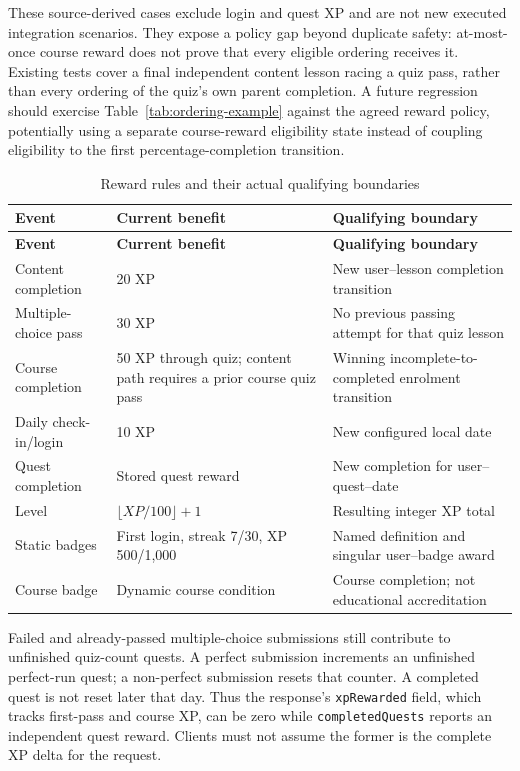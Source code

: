 \documentclass[12pt,a4paper,oneside]{report}
\begin{document}
These source-derived cases exclude login and quest XP and are not new executed
integration scenarios. They expose a policy gap beyond duplicate safety: at-most-once
course reward does not prove that every eligible ordering receives it. Existing tests
cover a final independent content lesson racing a quiz pass, rather than every
ordering of the quiz's own parent completion. A future regression should exercise
Table~\ref{tab:ordering-example} against the agreed reward policy, potentially using
a separate course-reward eligibility state instead of coupling eligibility to the
first percentage-completion transition.

\begin{longtable}{P{0.27\textwidth}P{0.32\textwidth}P{0.30\textwidth}}
\caption{Reward rules and their actual qualifying boundaries}\label{tab:reward-rules}\\\toprule
\textbf{Event} & \textbf{Current benefit} & \textbf{Qualifying boundary}\\\midrule\endfirsthead
\toprule\textbf{Event} & \textbf{Current benefit} & \textbf{Qualifying boundary}\\\midrule\endhead
Content completion & 20 XP & New user--lesson completion transition\\
Multiple-choice pass & 30 XP & No previous passing attempt for that quiz lesson\\
Course completion & 50 XP through quiz; content path requires a prior course quiz pass & Winning incomplete-to-completed enrolment transition\\
Daily check-in/login & 10 XP & New configured local date\\
Quest completion & Stored quest reward & New completion for user--quest--date\\
Level & $\lfloor XP/100\rfloor+1$ & Resulting integer XP total\\
Static badges & First login, streak 7/30, XP 500/1,000 & Named definition and singular user--badge award\\
Course badge & Dynamic course condition & Course completion; not educational accreditation\\
\bottomrule
\end{longtable}

Failed and already-passed multiple-choice submissions still contribute to unfinished
quiz-count quests. A perfect submission increments an unfinished perfect-run quest;
a non-perfect submission resets that counter. A completed quest is not reset later
that day. Thus the response's \texttt{xpRewarded} field, which tracks first-pass and
course XP, can be zero while \texttt{completedQuests} reports an independent quest
reward. Clients must not assume the former is the complete XP delta for the request.
\end{document}
